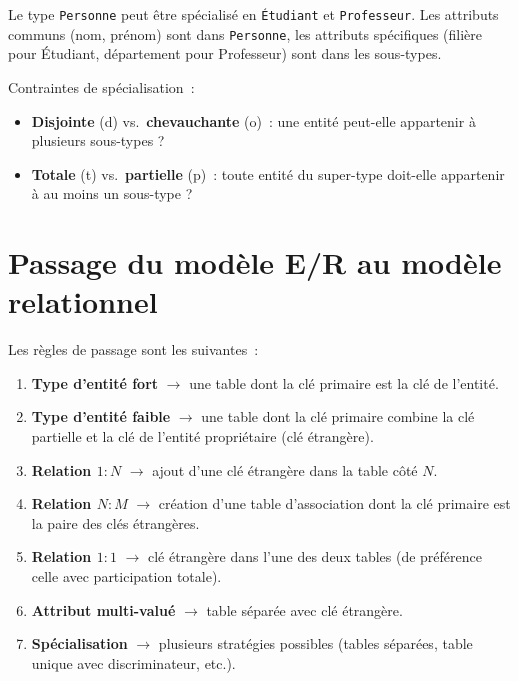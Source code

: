 \begin{exemple}
Le type \texttt{Personne} peut \^etre sp\'ecialis\'e en \texttt{\'Etudiant} et
\texttt{Professeur}. Les attributs communs (nom, pr\'enom) sont dans
\texttt{Personne}, les attributs sp\'ecifiques (fili\`ere pour \'Etudiant,
d\'epartement pour Professeur) sont dans les sous-types.
\end{exemple}

Contraintes de sp\'ecialisation~:
\begin{itemize}
    \item \textbf{Disjointe} (d) vs.\ \textbf{chevauchante} (o)~: une entit\'e
          peut-elle appartenir \`a plusieurs sous-types ?
    \item \textbf{Totale} (t) vs.\ \textbf{partielle} (p)~: toute entit\'e
          du super-type doit-elle appartenir \`a au moins un sous-type ?
\end{itemize}

\section{Passage du mod\`ele E/R au mod\`ele relationnel}

\begin{theoreme}
Les r\`egles de passage sont les suivantes~:
\begin{enumerate}
    \item \textbf{Type d'entit\'e fort} $\to$ une table dont la cl\'e primaire est
          la cl\'e de l'entit\'e.
    \item \textbf{Type d'entit\'e faible} $\to$ une table dont la cl\'e primaire
          combine la cl\'e partielle et la cl\'e de l'entit\'e propri\'etaire
          (cl\'e \'etrang\`ere).
    \item \textbf{Relation $1:N$} $\to$ ajout d'une cl\'e \'etrang\`ere dans la table
          c\^ot\'e $N$.
    \item \textbf{Relation $N:M$} $\to$ cr\'eation d'une table d'association dont la
          cl\'e primaire est la paire des cl\'es \'etrang\`eres.
    \item \textbf{Relation $1:1$} $\to$ cl\'e \'etrang\`ere dans l'une des deux tables
          (de pr\'ef\'erence celle avec participation totale).
    \item \textbf{Attribut multi-valu\'e} $\to$ table s\'epar\'ee avec cl\'e \'etrang\`ere.
    \item \textbf{Sp\'ecialisation} $\to$ plusieurs strat\'egies possibles
          (tables s\'epar\'ees, table unique avec discriminateur, etc.).
\end{enumerate}
\end{theoreme}

